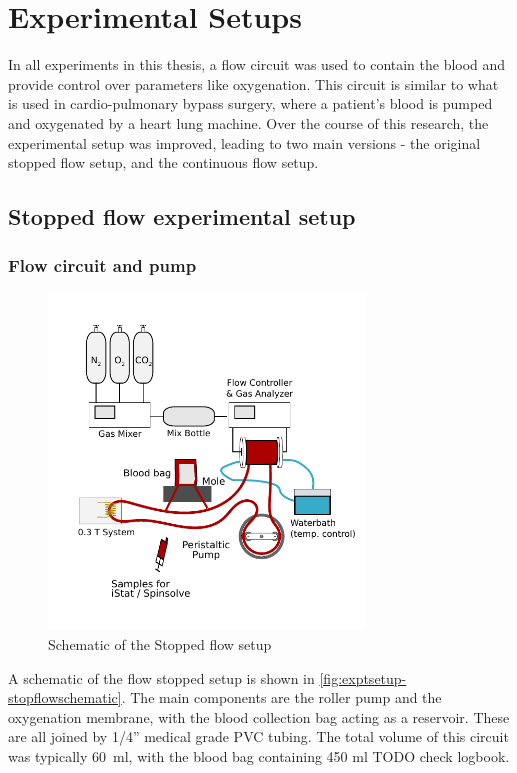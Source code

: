 \chapter{Experimental Setups}
\label{ch:exptsetup}

In all experiments in this thesis, a flow circuit was used to contain the blood and provide control over parameters like oxygenation.
This circuit is similar to what is used in cardio-pulmonary bypass surgery, where a patient's blood is pumped and oxygenated by a heart lung machine.
Over the course of this research, the experimental setup was improved, leading to two main versions - the original stopped flow setup, and the continuous flow setup.

\section{Stopped flow experimental setup}
\label{sec:exptsetup-stopflow}

\subsection{Flow circuit and pump}
\begin{figure}[t]
\centering
\includegraphics[width=0.75\textwidth]{figures/exptsetup/BloodMixingSetup.pdf}
\caption{Schematic of the Stopped flow setup}
\label{fig:exptsetup-stopflowschematic}
\end{figure}

A schematic of the flow stopped setup is shown in \autoref{fig:exptsetup-stopflowschematic}.
The main components are the roller pump and the oxygenation membrane, with the blood collection bag acting as a reservoir.
These are all joined by 1/4'' medical grade PVC tubing.
The total volume of this circuit was typically \SI{60}{\milli\litre}, with the blood bag containing 450 ml TODO check logbook.

